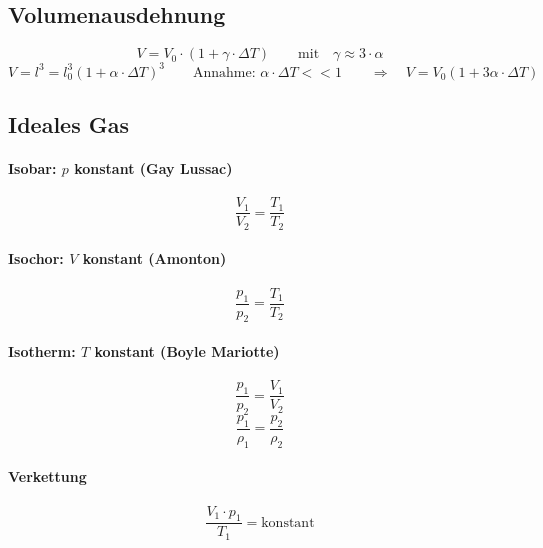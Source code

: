 \subsection{Volumenausdehnung}
\begin{equation}
	V = V_0\cdot(1+\gamma\cdot\Delta T)\qquad\text{mit}\quad\gamma\approx 3\cdot\alpha
\end{equation}
\begin{equation}
	V=l^3=l_0^3(1+\alpha\cdot\Delta T)^3\qquad\text{Annahme: }\alpha\cdot\Delta T << 1\qquad\Longrightarrow\quad V=V_0(1+3\alpha\cdot\Delta T)
\end{equation}

\subsection{Ideales Gas}

\paragraph{Isobar: $p$ konstant (Gay Lussac)}
\begin{equation}
	\frac{V_1}{V_2}=\frac{T_1}{T_2}
\end{equation}

\paragraph{Isochor: $V$ konstant (Amonton)}
\begin{equation}
	\frac{p_1}{p_2}=\frac{T_1}{T_2}
\end{equation}

\paragraph{Isotherm: $T$ konstant (Boyle Mariotte)}
\begin{equation}
	\frac{p_1}{p_2}=\frac{V_1}{V_2}
\end{equation}
\begin{equation}
	\frac{p_1}{\rho_1}=\frac{p_2}{\rho_2}
\end{equation}

\paragraph{Verkettung}
\begin{equation}
	\frac{V_1\cdot p_1}{T_1} = \text{konstant}
\end{equation}

